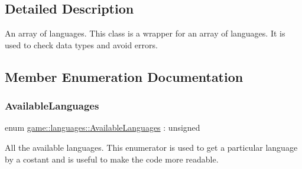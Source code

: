 \subsection{Detailed Description}
An array of languages. This class is a wrapper for an array of languages. It is used to check data types and avoid errors. 

\subsection{Member Enumeration Documentation}
\mbox{\label{classgame_1_1languages_ad965ce3a9fdce02ab3caba6301f221eb}} 
\subsubsection{\texorpdfstring{AvailableLanguages}{AvailableLanguages}}
{\footnotesize\ttfamily enum \mbox{\hyperlink{classgame_1_1languages_ad965ce3a9fdce02ab3caba6301f221eb}{game\+::languages\+::\+Available\+Languages}} \+: unsigned}



All the available languages. This enumerator is used to get a particular language by a costant and is useful to make the code more readable. 

